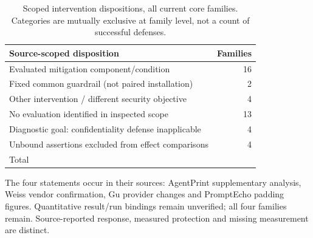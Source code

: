 \begin{table}[t]\centering\footnotesize
\caption{Scoped intervention dispositions, all \FinalCore{} current core families. Categories are mutually exclusive at family level, not a count of successful defenses.}\label{tab:intervention-status}
\begin{tabularx}{\columnwidth}{@{}Yr@{}}\toprule
Source-scoped disposition & Families\\\midrule
Evaluated mitigation component/condition & 16\\
Fixed common guardrail (not paired installation) & 2\\
Other intervention / different security objective & 4\\
No evaluation identified in inspected scope & 13\\
Diagnostic goal: confidentiality defense inapplicable & 4\\
Unbound assertions excluded from effect comparisons & 4\\\midrule
Total & \FinalCore{}\\\bottomrule
\end{tabularx}
\par\smallskip\raggedright\footnotesize
The four statements occur in their sources: AgentPrint supplementary analysis, Weiss vendor confirmation, Gu provider changes and PromptEcho padding figures. Quantitative result/run bindings remain unverified; all four families remain. Source-reported response, measured protection and missing measurement are distinct.
\end{table}
